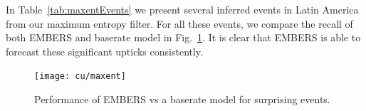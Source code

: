 In Table~\ref{tab:maxentEvents} we present several inferred events in Latin America from our maximum entropy
filter.
For all these events, we compare the recall of both EMBERS and baserate model in Fig.~\ref{fig:maxent}.
It is clear that EMBERS is able to forecast these significant upticks consistently.

\begin{figure}[H]
\centering
\texttt{[image: cu/maxent]}
\caption{Performance of EMBERS vs a baserate model for surprising events.}
\label{fig:maxent}
\end{figure}
